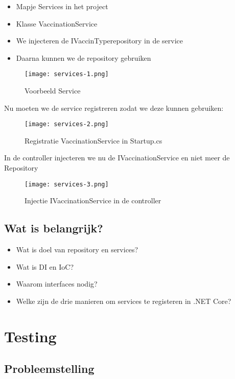 \documentclass{article}
\begin{document}
\begin{itemize}
    \item Mapje Services in het project
    \item Klasse VaccinationService
    \item We injecteren de IVaccinTyperepository in de service
    \item Daarna kunnen we de repository gebruiken
\end{itemize}

\begin{figure}[H]
    \centering
    \texttt{[image: services-1.png]}
    \caption{Voorbeeld Service}
\end{figure}

Nu moeten we de service registreren zodat we deze kunnen gebruiken:

\begin{figure}[H]
    \centering
    \texttt{[image: services-2.png]}
    \caption{Registratie VaccinationService in Startup.cs}
\end{figure}

In de controller injecteren we nu de IVaccinationService en niet meer de Repository

\begin{figure}[H]
    \centering
    \texttt{[image: services-3.png]}
    \caption{Injectie IVaccinationService in de controller}
\end{figure}

\subsection{Wat is belangrijk?}

\begin{itemize}
    \item Wat is doel van repository en services?
    \item Wat is DI en IoC?
    \item Waarom interfaces nodig?
    \item Welke zijn de drie manieren om services te registeren in .NET Core?
\end{itemize}

\section{Testing}

\subsection{Probleemstelling}
\end{document}
